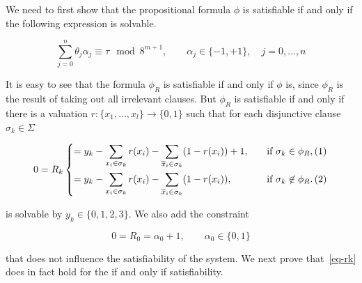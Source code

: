 \documentclass{amsart}
\newcommand{\ov}{\overline}
\theoremstyle{plain}
\begin{document}
We need to first show that the propositional formula $\phi$ is satisfiable if and only if the
following expression is solvable.

\begin{equation*}
  \sum_{j=0}^n \theta_j\alpha_j\equiv\tau\mod 8^{m+1},\qquad\alpha_j\in\{-1,+1\},\quad j=0,\ldots,n
\end{equation*}

It is easy to see that the formula $\phi_R$ is satisfiable if and only if $\phi$ is, since $\phi_R$
is the result of taking out all irrelevant clauses. But $\phi_R$ is satisfiable if and only if
there is a valuation $r:\{x_1,\ldots,x_l\}\to\{0,1\}$ such that for each disjunctive clause
$\sigma_k\in\Sigma$

\begin{equation}\label{eq-rk}
  0 = R_k
  \begin{dcases}
    =y_k-\sum_{x_i\in\sigma_k} r(x_i)-\sum_{\ov{x}_i\in\sigma_k} (1-r(x_i))+1, \quad&\text{if }
    \sigma_k\in\phi_R,\hfill(1)\\
    =y_k-\sum_{x_i\in\sigma_k} r(x_i)-\sum_{\ov{x}_i\in\sigma_k} (1-r(x_i)), \quad&\text{if }
    \sigma_k\not\in\phi_R.\hfill(2)
  \end{dcases}
\end{equation}

is solvable by $y_k\in\{0,1,2,3\}$. We also add the constraint

\begin{equation*}
  0 = R_0 = \alpha_0 + 1, \qquad \alpha_0\in\{0, 1\}
\end{equation*}

that does not influence the satisfiability of the system. We next prove that~\autoref{eq-rk} does
in fact hold for the if and only if satisfiability.
\end{document}
